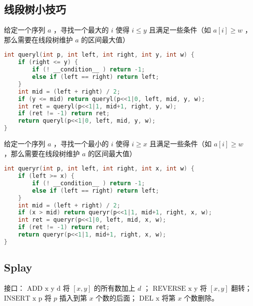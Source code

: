 \documentclass[landscape,a4paper]{article}
\begin{document}
\subsection{线段树小技巧}
给定一个序列 $a$ ，寻找一个最大的 $i$ 使得 $i \leq y$ 且满足一些条件（如 $a[i] \geq w$ ，那么需要在线段树维护 $a$ 的区间最大值）
\begin{lstlisting}[language=C++]
int queryl(int p, int left, int right, int y, int w) {
	if (right <= y) {
		if (! __condition__ ) return -1;
		else if (left == right) return left;
	}
	int mid = (left + right) / 2;
	if (y <= mid) return queryl(p<<1|0, left, mid, y, w);
	int ret = queryl(p<<1|1, mid+1, right, y, w);
	if (ret != -1) return ret;
	return queryl(p<<1|0, left, mid, y, w);
}
\end{lstlisting}
给定一个序列 $a$ ，寻找一个最小的 $i$ 使得 $i \geq x$ 且满足一些条件（如 $a[i] \geq w$ ，那么需要在线段树维护 $a$ 的区间最大值）
\begin{lstlisting}[language=C++]
int queryr(int p, int left, int right, int x, int w) {
	if (left >= x) {
		if (! __condition__ ) return -1;
		else if (left == right) return left;
	}
	int mid = (left + right) / 2;
	if (x > mid) return queryr(p<<1|1, mid+1, right, x, w);
	int ret = queryr(p<<1|0, left, mid, x, w);
	if (ret != -1) return ret;
	return queryr(p<<1|1, mid+1, right, x, w);
}
\end{lstlisting}
\subsection{Splay}

接口： 
 $\text{ADD x y d}$ 将 $[x, y]$ 的所有数加上 $d$ ；
 $\text{REVERSE x y}$  将 $[x, y]$ 翻转；
 $\text{INSERT x p}$ 将 $p$ 插入到第 $x$ 个数的后面；
 $\text{DEL x}$ 将第 $x$ 个数删除。
\end{document}
